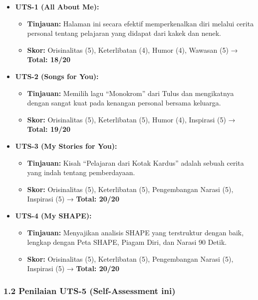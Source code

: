 \documentclass[
  letterpaper,
  DIV=11,
  numbers=noendperiod]{scrreprt}
\providecommand{\tightlist}{%
  \setlength{\itemsep}{0pt}\setlength{\parskip}{0pt}}
\begin{document}
\begin{itemize}
\tightlist
\item
  \textbf{UTS-1 (All About Me):}

  \begin{itemize}
  \tightlist
  \item
    \textbf{Tinjauan:} Halaman ini secara efektif memperkenalkan diri
    melalui cerita personal tentang pelajaran yang didapat dari kakek
    dan nenek.
  \item
    \textbf{Skor:} Orisinalitas (5), Keterlibatan (4), Humor (4),
    Wawasan (5) → \textbf{Total: 18/20}
  \end{itemize}
\item
  \textbf{UTS-2 (Songs for You):}

  \begin{itemize}
  \tightlist
  \item
    \textbf{Tinjauan:} Memilih lagu ``Monokrom'' dari Tulus dan
    mengikatnya dengan sangat kuat pada kenangan personal bersama
    keluarga.
  \item
    \textbf{Skor:} Orisinalitas (5), Keterlibatan (5), Humor (4),
    Inspirasi (5) → \textbf{Total: 19/20}
  \end{itemize}
\item
  \textbf{UTS-3 (My Stories for You):}

  \begin{itemize}
  \tightlist
  \item
    \textbf{Tinjauan:} Kisah ``Pelajaran dari Kotak Kardus'' adalah
    sebuah cerita yang indah tentang pemberdayaan.
  \item
    \textbf{Skor:} Orisinalitas (5), Keterlibatan (5), Pengembangan
    Narasi (5), Inspirasi (5) → \textbf{Total: 20/20}
  \end{itemize}
\item
  \textbf{UTS-4 (My SHAPE):}

  \begin{itemize}
  \tightlist
  \item
    \textbf{Tinjauan:} Menyajikan analisis SHAPE yang terstruktur dengan
    baik, lengkap dengan Peta SHAPE, Piagam Diri, dan Narasi 90 Detik.
  \item
    \textbf{Skor:} Orisinalitas (5), Keterlibatan (5), Pengembangan
    Narasi (5), Inspirasi (5) → \textbf{Total: 20/20}
  \end{itemize}
\end{itemize}

\subsubsection{1.2 Penilaian UTS-5 (Self-Assessment
ini)}\label{penilaian-uts-5-self-assessment-ini}
\end{document}
